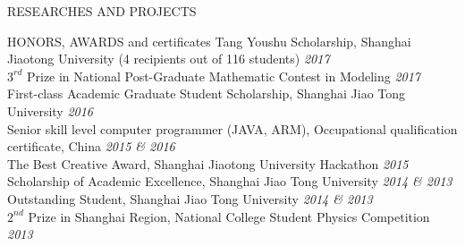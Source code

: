 \documentclass{resume_new} %
\begin{document}
\begin{rSection}{RESEARCHES AND PROJECTS}
\begin{comment}
\begin{rSubsection}{``Yorozuya'', a Campus Labor and Information Exchange Platform}{Nov. 2014}{}{}
\item Developed a web application for campus users to exchange labor and information in ``Hackathon SJTU 2014'' with a teammate. Users can release tasks on this app while the others can choose and finish jobs for reward.
\end{rSubsection}
\end{comment}
\end{rSection}

\begin{rSection}{HONORS, AWARDS and certificates}
Tang Youshu Scholarship, Shanghai Jiaotong University (4 recipients out of 116 students) \hfill \emph{2017}
\\$3^{rd}$ Prize in National Post-Graduate Mathematic Contest in Modeling \hfill \emph{2017}
\\First-class Academic Graduate Student Scholarship, Shanghai Jiao Tong University  \hfill \emph{2016}
\\Senior skill level computer programmer (JAVA, ARM), Occupational qualification certificate, China \hfill \emph{2015 \& 2016}
\\The Best Creative Award, Shanghai Jiaotong University Hackathon \hfill \emph{2015}
\\Scholarship of Academic Excellence, Shanghai Jiao Tong University \hfill \emph{2014 \& 2013}
\\Outstanding Student, Shanghai Jiao Tong University \hfill \emph{2014 \& 2013}
\\$2^{nd}$ Prize in Shanghai Region, National College Student Physics Competition \hfill \emph{2013}
\end{rSection}





\end{document}
